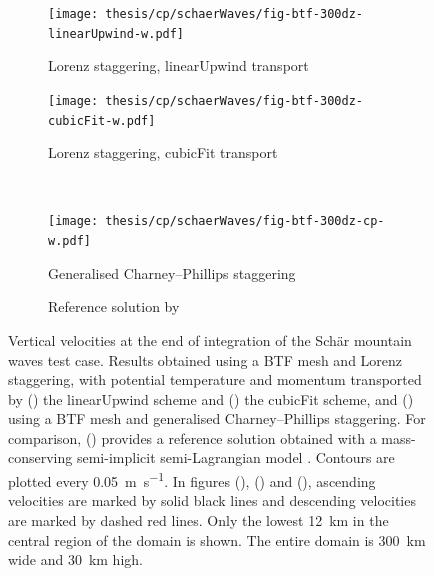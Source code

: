 \begin{figure}
	\centering
	\begin{subfigure}{0.55\textwidth}
		\centering
		\caption{Lorenz staggering, linearUpwind transport}
		\label{fig:cp:schaerWaves:w:linearUpwind}
		\texttt{[image: thesis/cp/schaerWaves/fig-btf-300dz-linearUpwind-w.pdf]}
	\end{subfigure}
	\begin{subfigure}{0.44\textwidth}
		\centering
		\caption{Lorenz staggering, cubicFit transport}
		\label{fig:cp:schaerWaves:w:cubicFit}
		\texttt{[image: thesis/cp/schaerWaves/fig-btf-300dz-cubicFit-w.pdf]}
	\end{subfigure}
	\\
	\vspace*{1em}
	\begin{subfigure}{0.55\textwidth}
		\centering
		\caption{Generalised Charney--Phillips staggering}
		\label{fig:cp:schaerWaves:w:cp}
		\texttt{[image: thesis/cp/schaerWaves/fig-btf-300dz-cp-w.pdf]}
	\end{subfigure}
	\begin{subfigure}{0.44\textwidth}
		\centering
		\caption{Reference solution by \citet{melvin2010}}
		\label{fig:cp:schaerWaves:w:melvin}
	\end{subfigure}
	\caption{Vertical velocities at the end of integration of the Sch\"{a}r mountain waves test case.
	Results obtained using a BTF mesh and Lorenz staggering, with potential temperature and momentum transported by () the linearUpwind scheme and
	() the cubicFit scheme, and () using a BTF mesh and generalised Charney--Phillips staggering.
	For comparison, () provides a reference solution obtained with a mass-conserving semi-implicit semi-Lagrangian model \citep{melvin2010}.
	Contours are plotted every \SI{0.05}{\meter\per\second}.  In figures (), () and (), ascending velocities are marked by solid black lines and descending velocities are marked by dashed red lines.
Only the lowest \SI{12}{\kilo\meter} in the central region of the domain is shown.  The entire domain is \SI{300}{\kilo\meter} wide and \SI{30}{\kilo\meter} high.
	}
	\label{fig:cp:schaerWaves:w}
\end{figure}

